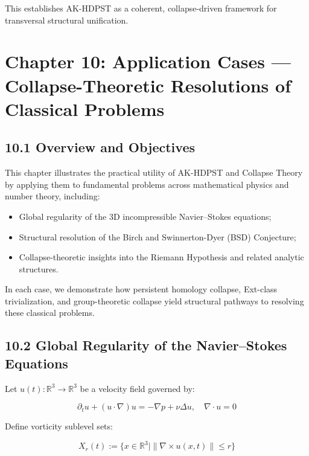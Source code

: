 \documentclass[11pt]{article}
\begin{document}
This establishes AK-HDPST as a coherent, collapse-driven framework for transversal structural unification.



\section{Chapter 10: Application Cases — Collapse-Theoretic Resolutions of Classical Problems}

\subsection*{10.1 Overview and Objectives}

This chapter illustrates the practical utility of AK-HDPST and Collapse Theory by applying them to fundamental problems across mathematical physics and number theory, including:

\begin{itemize}
    \item Global regularity of the 3D incompressible Navier–Stokes equations;
    \item Structural resolution of the Birch and Swinnerton-Dyer (BSD) Conjecture;
    \item Collapse-theoretic insights into the Riemann Hypothesis and related analytic structures.
\end{itemize}

In each case, we demonstrate how persistent homology collapse, Ext-class trivialization, and group-theoretic collapse yield structural pathways to resolving these classical problems.

\subsection*{10.2 Global Regularity of the Navier–Stokes Equations}

Let \( u(t) : \mathbb{R}^3 \to \mathbb{R}^3 \) be a velocity field governed by:

\[
\partial_t u + (u \cdot \nabla)u = -\nabla p + \nu \Delta u, \quad \nabla \cdot u = 0
\]

Define vorticity sublevel sets:

\[
X_r(t) := \{ x \in \mathbb{R}^3 \mid \| \nabla \times u(x,t) \| \leq r \}
\]
\end{document}
